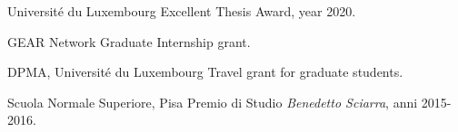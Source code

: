 {%
	Universit\'e du Luxembourg}
{%
	Excellent Thesis Award, year 2020.}
{}

{%
	GEAR Network}
{%
	Graduate Internship grant.}
{}

{%
	DPMA, Universit\'e du Luxembourg}
{%
	Travel grant for graduate students.}
{}

{%
	Scuola Normale Superiore, Pisa}
{%
	Premio di Studio \emph{Benedetto Sciarra}, anni 2015-2016.}
{}